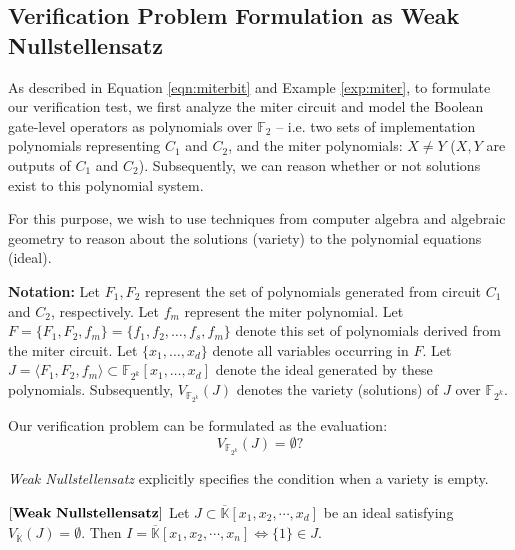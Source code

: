 \subsection{Verification Problem Formulation as Weak Nullstellensatz}

As described in Equation \ref{eqn:miterbit} and Example \ref{exp:miter},
to formulate our verification test, we first analyze the miter circuit and 
model the Boolean gate-level operators as polynomials over $\mathbb{F}_2$
-- i.e. two sets of implementation polynomials representing $C_{1}$ and $C_{2}$, 
and the miter polynomials: $X \neq Y$ ($X,Y$ are outputs of $C_{1}$ and $C_{2}$). 
Subsequently, we can reason whether or not solutions exist
to this polynomial system. 

For this purpose, we wish to use techniques from computer algebra and
algebraic geometry to reason about the solutions (variety) to the
polynomial equations (ideal).  

{\bf {Notation:}} Let $F_1, F_2$ represent the set of
polynomials 
generated from circuit $C_1$ and 
$C_2$, respectively. Let $f_m$ represent the miter polynomial. Let
$F=\{F_1,F_2,f_m\}=\{f_1,f_2,\ldots,f_s, f_m\}$ denote this set of
polynomials derived from the miter circuit.  Let $\{x_1,\dots,x_d\}$
denote all variables occurring in $F$. Let $J = \langle
F_1,F_2, f_m\rangle \subset \mathbb{F}_{2^k}[x_{1},\dots,x_{d}]$
denote the ideal generated by these polynomials. 
Subsequently, $V_{\mathbb{F}_{2^k}}(J)$ denotes the variety
(solutions) of $J$ over $\mathbb{F}_{2^k}$. 

Our verification problem
can be formulated as the evaluation: 
\begin{equation}
V_{\mathbb{F}_{2^k}}(J)=\emptyset?
\end{equation}


{\it Weak  Nullstellensatz} \cite{null:1890} explicitly specifies the
condition when a variety is empty. 

\begin{Theorem}
$\left[\bf{Weak\  Nullstellensatz}\right]$ Let $J \subset \overline
{\mathbb{K}}[x_1, x_2, \cdots, x_d]$ be an ideal satisfying
$V_{\overline{\mathbb{K}}}(J)=\emptyset$. Then $I=\overline {\mathbb{K}}[x_1,
x_2, \cdots, x_n] \iff \{1\} \in J$. 
\end{Theorem}

